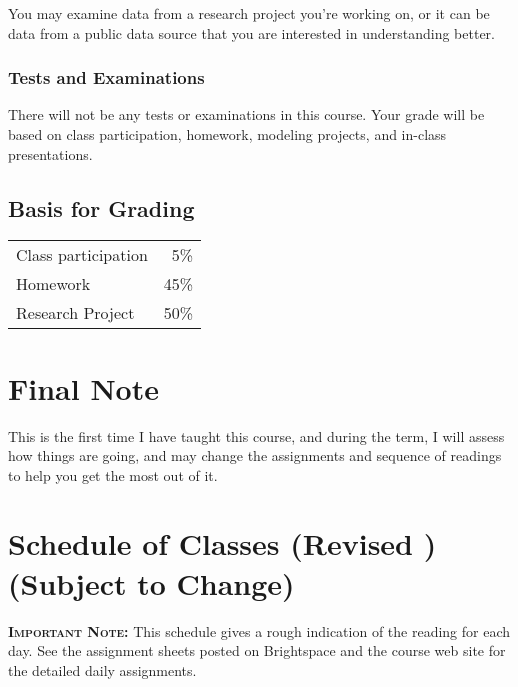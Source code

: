 \documentclass[11pt,twoside]{jgsyllabus}\usepackage[]{graphicx}\usepackage[]{xcolor}
\begin{document}
You may examine data from a research project you're working on, or it can be data
from a public data source that you are interested in understanding better.

\subsubsection[Tests \& Exams]{Tests and Examinations}

There will not be any tests or examinations in this course. Your grade will be
based on class participation, homework, modeling projects, and in-class
presentations.

\subsection[Grades]{Basis for Grading}

\begin{tabular}{|lr|}
\hline
Class participation &  5\% \\
Homework            & 45\% \\
Research Project    & 50\% \\
\hline
\end{tabular}

\section{Final Note}

This is the first time I have taught this course, and during the term, I will
assess how things are going, and may change the assignments and sequence of
readings to help you get the most out of it.
%
%
\iftrue

\fi
%
%
%
%
%
%
%

\cleardoublepage
\clearpage
\appendix
\setcounter{secnumdepth}{0}
\newcommand{\maybehline}{\hline}%
\setlength\extrarowheight{4pt}
\section[Class Schedule]{Schedule of Classes
\ifrevised
	(Revised \RevisionDate)%
\else
	(Subject to Change)%
\fi}

\textbf{\scshape Important Note:} This schedule gives a rough indication of the
reading for each day. See the assignment sheets posted on Brightspace
and the course web site for the detailed daily assignments.
\end{document}
